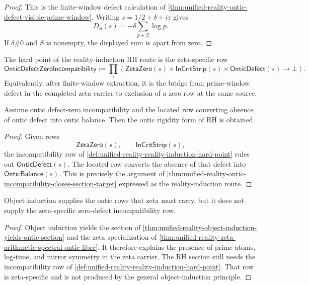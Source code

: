\begin{proof}
This is the finite-window defect calculation of
\autoref{thm:unified-reality-ontic-defect-visible-prime-window}.  Writing
$s=1/2+\delta+i\tau$ gives
$$
D_S(s)
=
-\delta\sum_{p\in S}\log p.
$$
If $\delta\#0$ and $S$ is nonempty, the displayed sum is apart from
zero.
\end{proof}

\begin{definition}
\label{def:unified-reality-reality-induction-hard-point}
The hard point of the reality-induction RH route is the zeta-specific
row
$$
\mathsf{OnticDefectZeroIncompatibility}
:=
\prod_s
\left(
\mathsf{ZetaZero}(s)\times
\mathsf{InCritStrip}(s)\times
\mathsf{OnticDefect}(s)
\to
\bot
\right).
$$
Equivalently, after finite-window extraction, it is the bridge from
prime-window defect in the completed zeta carrier to exclusion of a
zero row at the same source.
\end{definition}

\begin{theorem}
\label{thm:unified-reality-hard-point-closes-rh-route}
Assume ontic defect-zero incompatibility and the located row converting
absence of ontic defect into ontic balance.  Then the ontic rigidity
form of RH is obtained.
\end{theorem}

\begin{proof}
Given rows
$$
\mathsf{ZetaZero}(s),
\qquad
\mathsf{InCritStrip}(s),
$$
the incompatibility row of
\autoref{def:unified-reality-reality-induction-hard-point} rules out
$\mathsf{OnticDefect}(s)$.  The located row converts the absence of
that defect into $\mathsf{OnticBalance}(s)$.  This is precisely the
argument of
\autoref{thm:unified-reality-ontic-incompatibility-closes-section-target}
expressed as the reality-induction route.
\end{proof}

\begin{corollary}
\label{cor:unified-reality-object-induction-does-not-prove-rh}
Object induction supplies the ontic rows that zeta must carry, but it
does not supply the zeta-specific zero-defect incompatibility row.
\end{corollary}

\begin{proof}
Object induction yields the section of
\autoref{thm:unified-reality-object-induction-yields-ontic-section} and
the zeta specialization of
\autoref{thm:unified-reality-zeta-arithmetic-spectral-ontic-fibre}.  It
therefore explains the presence of prime atoms, log-time, and mirror
symmetry in the zeta carrier.  The RH section still needs the
incompatibility row of
\autoref{def:unified-reality-reality-induction-hard-point}.  That row is
zeta-specific and is not produced by the general object-induction
principle.
\end{proof}

